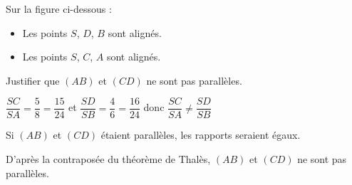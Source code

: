     Sur la figure ci-dessous :
    \begin{itemize}
        \item Les points $S$, $D$, $B$ sont alignés.
        \item Les points $S$, $C$, $A$ sont alignés.
    \end{itemize}

    Justifier que $(AB)$ et $(CD)$ ne sont pas parallèles.

    \smallskip
    {\color{red} $\dfrac{SC}{SA}=\dfrac{5}{8}=\dfrac{15}{24}$ et $\dfrac{SD}{SB}=\dfrac{4}{6}=\dfrac{16}{24}$ donc $\dfrac{SC}{SA}\neq \dfrac{SD}{SB}$

    \smallskip
    Si $(AB)$ et $(CD)$ étaient parallèles, les rapports seraient égaux.

    D'après la contraposée du théorème de Thalès, $(AB)$ et $(CD)$ ne sont pas parallèles.
    }

